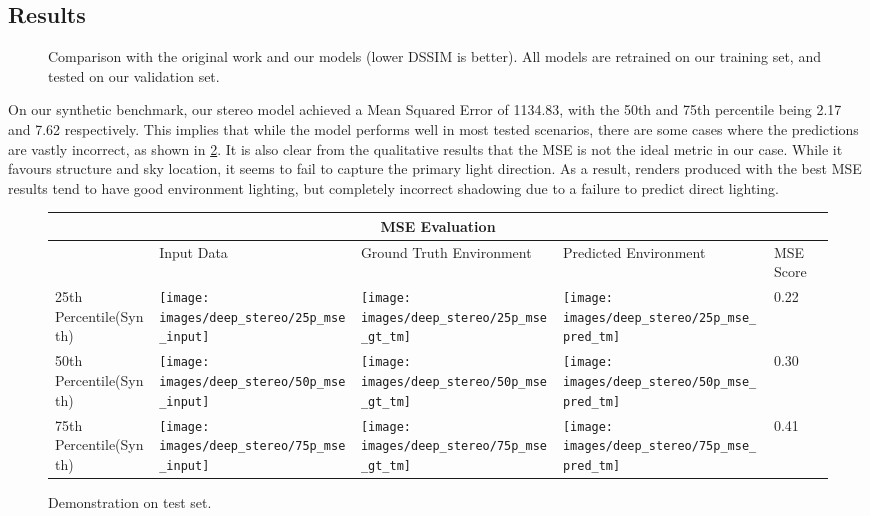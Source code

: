\documentclass[ %
                    author={Gavin Parker},
                supervisor={Dr. Neill Campbell},
                    degree={MEng},
                     title={Deep Learning for Illumination Estimation from Stereo Images},
                  subtitle={},
                      type={Research},
                      year={2018} ]{dissertation}
\begin{document}
\subsection{Results}
\begin{figure}[H]
\setlength\figureheight{6cm}
\setlength\figurewidth{8cm}
\centering

\caption{Comparison with the original work and our models (lower DSSIM is better). All models are retrained on our training set, and tested on our validation set.}
\label{fig:final_comp}
\end{figure}
On our synthetic benchmark, our stereo model achieved a Mean Squared Error of 1134.83, with the 50th and 75th percentile being 2.17 and 7.62 respectively. This implies that while the model performs well in most tested scenarios, there are some cases where the predictions are vastly incorrect, as shown in \ref{tab:mse_results}. It is also clear from the qualitative results that the MSE is not the ideal metric in our case. While it favours structure and sky location, it seems to fail to capture the primary light direction. As a result, renders produced with the best MSE results tend to have good environment lighting, but completely incorrect shadowing due to a failure to predict direct lighting.
\newline
\begin{figure}[H]
\centering
\begin{tabular}{ |p{3cm}||p{3cm}|p{3cm}|p{3cm}|p{3cm}|  }
 \hline
 \multicolumn{5}{|c|}{MSE Evaluation} \\
 \hline
  & Input Data &Ground Truth Environment&Predicted Environment&MSE Score\\
 \hline
 25th Percentile(Synth)&\parbox[c]{1em}{
 \texttt{[image: images/deep\_stereo/25p\_mse\_input]}}&\parbox[c]{1em}{\texttt{[image: images/deep\_stereo/25p\_mse\_gt\_tm]}}&
\parbox[c]{1em}{\texttt{[image: images/deep\_stereo/25p\_mse\_pred\_tm]}}& 0.22\\
 50th Percentile(Synth)&\parbox[c]{1em}{
 \texttt{[image: images/deep\_stereo/50p\_mse\_input]}}&\parbox[c]{1em}{\texttt{[image: images/deep\_stereo/50p\_mse\_gt\_tm]}}&
\parbox[c]{1em}{\texttt{[image: images/deep\_stereo/50p\_mse\_pred\_tm]}}& 0.30\\
 75th Percentile(Synth)&\parbox[c]{1em}{
 \texttt{[image: images/deep\_stereo/75p\_mse\_input]}}&\parbox[c]{1em}{\texttt{[image: images/deep\_stereo/75p\_mse\_gt\_tm]}}&
\parbox[c]{1em}{\texttt{[image: images/deep\_stereo/75p\_mse\_pred\_tm]}}& 0.41\\
 \hline
\end{tabular}

\caption{Demonstration on test set.}
\label{tab:mse_results}

\end{figure}
\end{document}
